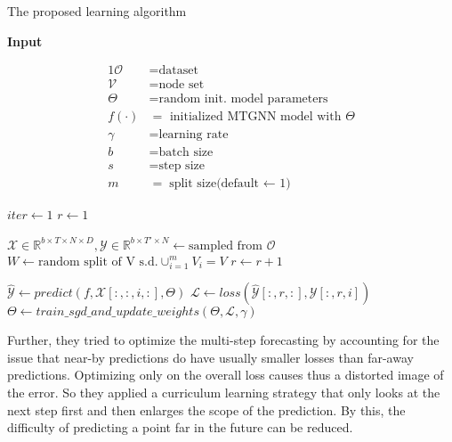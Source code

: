 \documentclass[letterpaper,twocolumn,12pt]{article}
\begin{document}
    \begin{algorithm}
        \scriptsize
        \caption{The proposed learning algorithm}\label{learning}
        \textbf{Input}

        \begin{alignat*}{1}
            \mathcal{O} &= \text{dataset} \\
            \mathcal{V} &= \text{node set} \\
            \Theta &= \text{random init. model parameters} \\
            f(\cdot) &= \text{ initialized MTGNN model with } \Theta  \\
            \gamma &= \text{learning rate} \\
            b &= \text{batch size} \\
            s &= \text{step size} \\
            m &= \text{split size(default $\gets$ 1)}
        \end{alignat*}

        \begin{algorithmic}[1]
            \State $iter \gets 1$
            \State $r \gets 1$

            \Repeat
                \State $\mathcal{X} \in \mathbb{R}^{b \times T \times N \times D},\mathcal{Y} \in \mathbb{R}^{b \times T' \times N} \gets \text{sampled from }\mathcal{O}$
                \State $W \gets \text{random split of V s.d.} \cup_{i=1}^m V_i = V $
                    \State $r \gets r+1$
                \EndIf

                    \State $\hat{\mathcal{Y}} \gets predict(f, \mathcal{X}[:,:,i,:], \Theta)$
                    \State $\mathcal{L} \gets loss(\hat{\mathcal{Y}}[:,r,:], \mathcal{Y}[:,r,i])$
                    \State $\Theta \gets train\_sgd\_and\_update\_weights(\Theta,\mathcal{L}, \gamma)$
                \EndFor
        \end{algorithmic}
    \end{algorithm}

    Further, they tried to optimize the multi-step forecasting by accounting for the issue that near-by predictions do have usually smaller losses than far-away predictions.
    Optimizing only on the overall loss causes thus a distorted image of the error.
    So they applied a curriculum learning strategy that only looks at the next step first and then enlarges the scope of the prediction.
    By this, the difficulty of predicting a point far in the future can be reduced.
\end{document}
